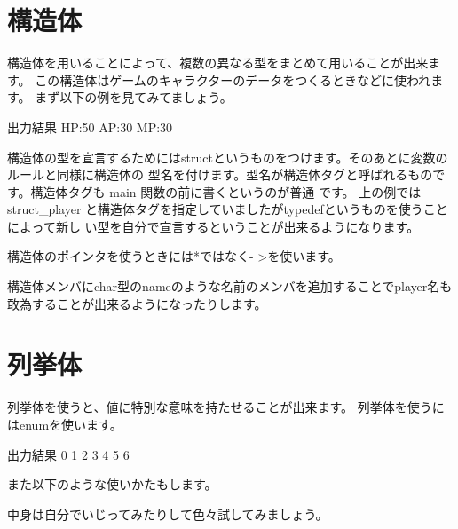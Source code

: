 ﻿\section{構造体}
構造体を用いることによって、複数の異なる型をまとめて用いることが出来ます。
この構造体はゲームのキャラクターのデータをつくるときなどに使われます。
まず以下の例を見てみてましょう。



\begin{itembox}{出力結果}
HP:50 AP:30 MP:30
\end{itembox}
構造体の型を宣言するためにはstructというものをつけます。そのあとに変数のルールと同様に構造体の
型名を付けます。型名が構造体タグと呼ばれるものです。構造体タグも main 関数の前に書くというのが普通
です。
上の例では struct\_player と構造体タグを指定していましたがtypedefというものを使うことによって新し
い型を自分で宣言するということが出来るようになります。



構造体のポインタを使うときには*ではなく- \textgreater を使います。


構造体メンバにchar型のnameのような名前のメンバを追加することでplayer名も敢為することが出来るようになったりします。

\section{列挙体}
列挙体を使うと、値に特別な意味を持たせることが出来ます。
列挙体を使うにはenumを使います。



\begin{itembox}{出力結果}
0 1 2 3 4 5 6
\end{itembox}
また以下のような使いかたもします。


中身は自分でいじってみたりして色々試してみましょう。


